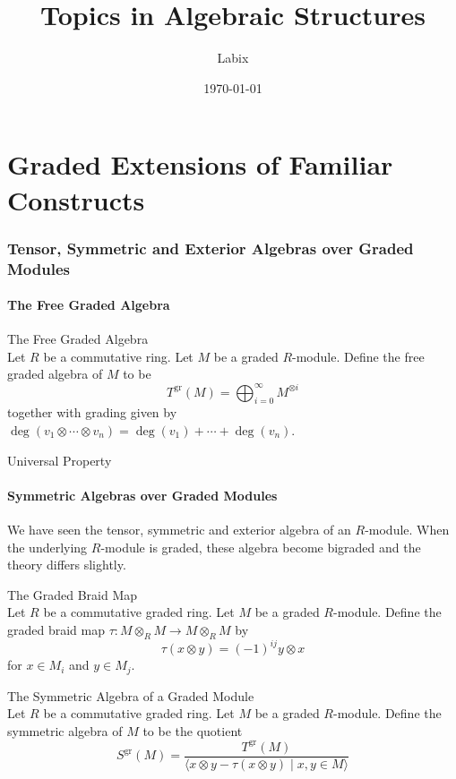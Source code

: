 \documentclass[a4paper]{article}
\title{Topics in Algebraic Structures}
\author{Labix}
\date{\today}
\begin{document}
\maketitle
\begin{abstract}
\end{abstract}
\pagebreak
\tableofcontents

\pagebreak
\part{Graded Extensions of Familiar Constructs}

\pagebreak
\section{Tensor, Symmetric and Exterior Algebras over Graded Modules}
\subsection{The Free Graded Algebra}
\begin{defn}{The Free Graded Algebra}{}\\
Let $R$ be a commutative ring. Let $M$ be a graded $R$-module. Define the free graded algebra of $M$ to be $$T^\text{gr}(M)=\bigoplus_{i=0}^\infty M^{\otimes i}$$ together with grading given by $\deg(v_1\otimes\cdots\otimes v_n)=\deg(v_1)+\cdots+\deg(v_n)$. 
\end{defn}

\begin{prp}{Universal Property}{}\\
\end{prp}

\subsection{Symmetric Algebras over Graded Modules}
We have seen the tensor, symmetric and exterior algebra of an $R$-module. When the underlying $R$-module is graded, these algebra become bigraded and the theory differs slightly. 

\begin{defn}{The Graded Braid Map}{}\\
Let $R$ be a commutative graded ring. Let $M$ be a graded $R$-module. Define the graded braid map $\tau:M\otimes_RM\to M\otimes_RM$ by $$\tau(x\otimes y)=(-1)^{ij}y\otimes x$$ for $x\in M_i$ and $y\in M_j$. 
\end{defn}

\begin{defn}{The Symmetric Algebra of a Graded Module}{}\\
Let $R$ be a commutative graded ring. Let $M$ be a graded $R$-module. Define the symmetric algebra of $M$ to be the quotient $$S^\text{gr}(M)=\frac{T^\text{gr}(M)}{\langle x\otimes y-\tau(x\otimes y)\;|\;x,y\in M\rangle}$$
\end{defn}
\end{document}
